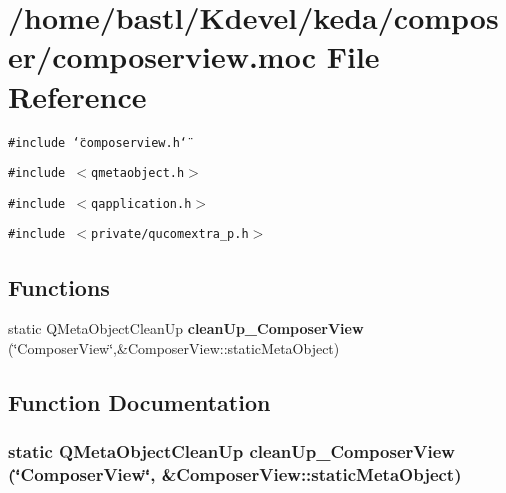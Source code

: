 \section{/home/bastl/Kdevel/keda/composer/composerview.moc File Reference}
\label{composerview_8moc}
{\tt \#include \char`\"{}composerview.h\char`\"{}}\par
{\tt \#include $<$qmetaobject.h$>$}\par
{\tt \#include $<$qapplication.h$>$}\par
{\tt \#include $<$private/qucomextra\_\-p.h$>$}\par
\subsection*{Functions}
\begin{CompactItemize}
\item 
static QMeta\-Object\-Clean\-Up {\bf clean\-Up\_\-Composer\-View} (\char`\"{}Composer\-View\char`\"{},\&Composer\-View::static\-Meta\-Object)
\end{CompactItemize}


\subsection{Function Documentation}
\subsubsection{\setlength{\rightskip}{0pt plus 5cm}static QMeta\-Object\-Clean\-Up clean\-Up\_\-Composer\-View (\char`\"{}Composer\-View\char`\"{}, \&Composer\-View::static\-Meta\-Object)\hspace{0.3cm}{\tt  [static]}}\label{composerview_8moc_d2b121e05174aa952002ea2f361faf93}


